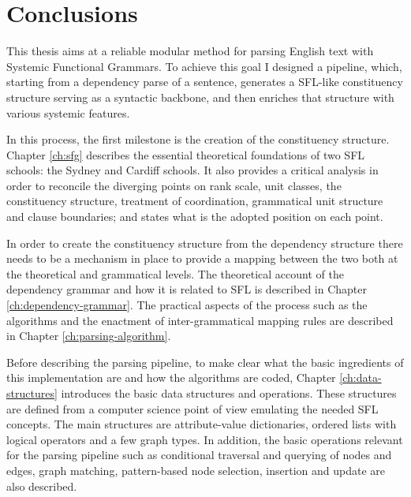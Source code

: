 \chapter{Conclusions}
\label{ch:conclusions}

    
    This thesis aims at a reliable modular method for parsing English text with Systemic Functional Grammars. To achieve this goal I designed a pipeline, which, starting from a dependency parse of a sentence, generates a SFL-like constituency structure serving as a syntactic backbone, and then enriches that structure with various systemic features.

    In this process, the first milestone is the creation of the constituency structure. Chapter \ref{ch:sfg} describes the essential theoretical foundations of two SFL schools: the Sydney and Cardiff schools. It also provides a critical analysis in order to reconcile the diverging points on rank scale, unit classes, the constituency structure, treatment of coordination, grammatical unit structure and clause boundaries; and states what is the adopted position on each point. 

    In order to create the constituency structure from the dependency structure there needs to be a mechanism in place to provide a mapping between the two both at the theoretical and grammatical levels. The theoretical account of the dependency grammar and how it is related to SFL is described in Chapter \ref{ch:dependency-grammar}. The practical aspects of the process such as the algorithms and the enactment of inter-grammatical mapping rules are described in Chapter \ref{ch:parsing-algorithm}. 

    Before describing the parsing pipeline, to make clear what the basic ingredients of this implementation are and how the algorithms are coded, Chapter \ref{ch:data-structures} introduces the basic data structures and operations. These structures are defined from a computer science point of view emulating the needed SFL concepts. The main structures are attribute-value dictionaries, ordered lists with logical operators and a few graph types. %
    In addition, the basic operations relevant for the parsing pipeline such as conditional traversal and querying of nodes and edges, graph matching, pattern-based node selection, insertion and update are also described.
    
